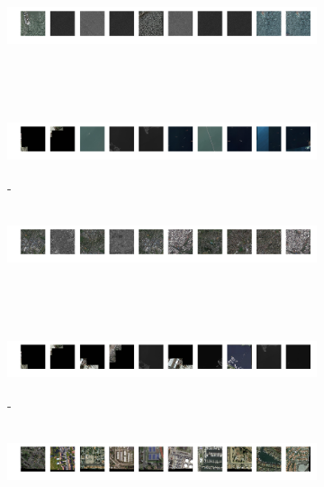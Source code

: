 \documentclass[conference]{IEEEtran}
\begin{document}
	
	\begin{figure}[h]
   	\center
    \begin{subfigure}[b]{\linewidth}
    	\includegraphics[width=\textwidth,height=2cm]{C2_0.png}
   	\end{subfigure}\\[-2ex]
   	\begin{subfigure}[b]{\linewidth}
      \includegraphics[width=\textwidth,height=2cm]{C2_1.png}
      \abovecaptionskip-\belowcaptionskip
      \caption{}
    \end{subfigure}
   	\begin{subfigure}[b]{\linewidth}
      \includegraphics[width=\textwidth,height=2cm]{C3_0.png}
    \end{subfigure}\\[-2ex]
   	\begin{subfigure}[b]{\linewidth}
      \includegraphics[width=\textwidth,height=2cm]{C3_1.png}
      \abovecaptionskip-\belowcaptionskip
      \caption{}
    \end{subfigure}
   	\begin{subfigure}[b]{\linewidth}
      \includegraphics[width=\textwidth,height=2cm]{C4_0.png}
    \end{subfigure}\\[-2ex]

\end{figure}
\end{document}
